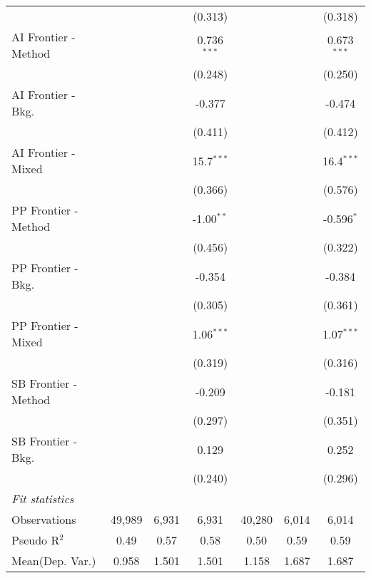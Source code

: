 \begin{tabular}{lcccccc}
                        &                &         & (0.313)        &               &         & (0.318)\\   
   AI Frontier - Method &                &         & 0.736$^{***}$  &               &         & 0.673$^{***}$\\   
                        &                &         & (0.248)        &               &         & (0.250)\\   
   AI Frontier - Bkg.   &                &         & -0.377         &               &         & -0.474\\   
                        &                &         & (0.411)        &               &         & (0.412)\\   
   AI Frontier - Mixed  &                &         & 15.7$^{***}$   &               &         & 16.4$^{***}$\\   
                        &                &         & (0.366)        &               &         & (0.576)\\   
   PP Frontier - Method &                &         & -1.00$^{**}$   &               &         & -0.596$^{*}$\\   
                        &                &         & (0.456)        &               &         & (0.322)\\   
   PP Frontier - Bkg.   &                &         & -0.354         &               &         & -0.384\\   
                        &                &         & (0.305)        &               &         & (0.361)\\   
   PP Frontier - Mixed  &                &         & 1.06$^{***}$   &               &         & 1.07$^{***}$\\   
                        &                &         & (0.319)        &               &         & (0.316)\\   
   SB Frontier - Method &                &         & -0.209         &               &         & -0.181\\   
                        &                &         & (0.297)        &               &         & (0.351)\\   
   SB Frontier - Bkg.   &                &         & 0.129          &               &         & 0.252\\   
                        &                &         & (0.240)        &               &         & (0.296)\\   
   \midrule
   \emph{Fit statistics}\\
   Observations         & 49,989         & 6,931   & 6,931          & 40,280        & 6,014   & 6,014\\  
   Pseudo R$^2$         & 0.49           & 0.57    & 0.58           & 0.50          & 0.59    & 0.59\\  
Mean(Dep. Var.) & 0.958 & 1.501 & 1.501 & 1.158 & 1.687 & 1.687 \\
   

\end{tabular}
